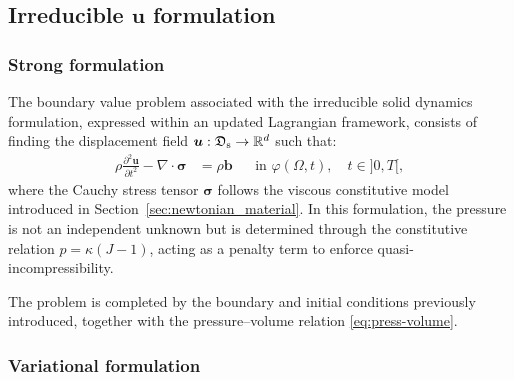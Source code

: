 \documentclass[11pt,english]{article}
\def\InitialDomain{\Omega}
\def\disp{\boldsymbol{u}}
\def\stress{\boldsymbol{\sigma}}
\begin{document}
\subsection{Irreducible $\disp$ formulation \label{sec:irreducible-formulation}}

\subsubsection{Strong formulation}

    The boundary value problem associated with the irreducible solid dynamics formulation, expressed within an updated Lagrangian framework, consists of finding the displacement field $\disp : \mathfrak{D}_{\rm{s}} \rightarrow \mathbb{R}^d$ such that:
    \begin{align}
    \rho \frac{\partial^2 \disp}{\partial t^2} - \nabla \cdot \stress &= \rho \boldsymbol{b}
    && \text{in } \varphi(\InitialDomain,t), \quad t \in ]0,T[,
    \label{eq:irr_momentum}
    \end{align}
    where the Cauchy stress tensor $\stress$ follows the viscous constitutive model introduced in Section~\ref{sec:newtonian_material}. In this formulation, the pressure is not an independent unknown but is determined through the constitutive relation $p = \kappa(J-1)$, acting as a penalty term to enforce quasi-incompressibility.
    
    The problem is completed by the boundary and initial conditions previously introduced, together with the pressure--volume relation \eqref{eq:press-volume}.

    

\subsubsection{Variational formulation}
\end{document}
